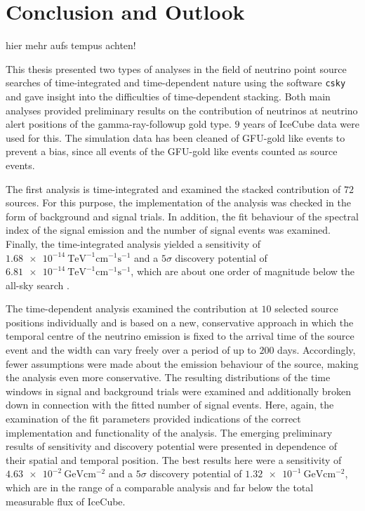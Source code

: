\chapter{Conclusion and Outlook} \label{sec:outlook}

hier mehr aufs tempus achten!

This thesis presented two types of analyses in the field of neutrino point source searches of time-integrated and time-dependent nature using the software \texttt{csky} and gave insight into the difficulties of time-dependent stacking.
Both main analyses provided preliminary results on the contribution of neutrinos at neutrino alert positions of the gamma-ray-followup gold type.
$\num{9}$ years of IceCube data were used for this.
The simulation data has been cleaned of GFU-gold like events to prevent a bias, since all events of the GFU-gold like events counted as source events.

The first analysis is time-integrated and examined the stacked contribution of $\num{72}$ sources.
For this purpose, the implementation of the analysis was checked in the form of background and signal trials.
In addition, the fit behaviour of the spectral index of the signal emission and the number of signal events was examined.
Finally, the time-integrated analysis yielded a sensitivity of $\SI{1.68e-14}{\tera\electronvolt\tothe{-1}\centi\meter\tothe{-1}\second\tothe{-1}}$ and a $\num{5}\sigma$ discovery potential of $\SI{6.81e-14}{\tera\electronvolt\tothe{-1}\centi\meter\tothe{-1}\second\tothe{-1}}$, which are about one order of magnitude below the all-sky search \cite{all_sky_paper}.

The time-dependent analysis examined the contribution at $\num{10}$ selected source positions individually and is based on a new, conservative approach in which the temporal centre of the neutrino emission is fixed to the arrival time of the source event and the width can vary freely over a period of up to $\num{200}$ days.
Accordingly, fewer assumptions were made about the emission behaviour of the source, making the analysis even more conservative.
The resulting distributions of the time windows in signal and background trials were examined and additionally broken down in connection with the fitted number of signal events.
Here, again, the examination of the fit parameters provided indications of the correct implementation and functionality of the analysis.
The emerging preliminary results of sensitivity and discovery potential were presented in dependence of their spatial and temporal position.
The best results here were a sensitivity of $\SI{4.63e-2}{\giga\electronvolt\centi\meter\tothe{-2}}$ and a $\num{5}\sigma$ discovery potential of $\SI{1.32e-1}{\giga\electronvolt\centi\meter\tothe{-2}}$, which are in the range of a comparable analysis \cite{martina} and far below the total measurable flux of IceCube.

